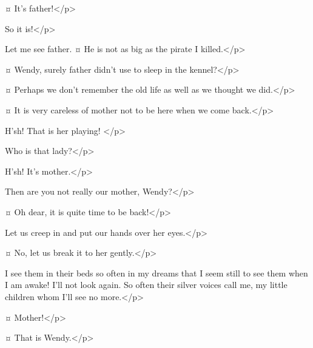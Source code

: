 \begin{drama}
\wendyspeaks {}¤
It's father!</p>

\johnspeaks
So it is!</p>

\michaelspeaks
Let me see father.
¤
He is not as big as the pirate I killed.</p>

\johnspeaks {}¤
Wendy, surely father didn't use to sleep in the kennel?</p>

\wendyspeaks {}¤
Perhaps we don't remember the old life as well as we thought we did.</p>

\johnspeaks {}¤
It is very careless of mother not to be here when we come back.</p>


\wendyspeaks
H'sh!
That is her playing!
</p>

\michaelspeaks
Who is that lady?</p>

\johnspeaks
H'sh!
It's mother.</p>

\michaelspeaks
Then are you not really our mother, Wendy?</p>

\wendyspeaks {}¤
Oh dear, it is quite time to be back!</p>

\johnspeaks
Let us creep in and put our hands over her eyes.</p>

\wendyspeaks {}¤
No, let us break it to her gently.</p>


\mrsdarlingspeaks
I see them in their beds so often in my dreams that I seem still to see them when I am awake!
I'll not look again.
So often their silver voices call me, my little children whom I'll see no more.</p>


\wendyspeaks {}¤
Mother!</p>

\mrsdarlingspeaks {}¤
That is Wendy.</p>


\end{drama}
